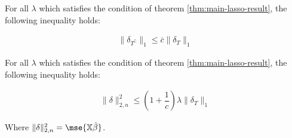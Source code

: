 \begin{claim}
\label{claim:lasso-claim-1}
For all $\lambda$ which satisfies the condition of theorem \ref{thm:main-lasso-result}, the following inequality holds:

\begin{align*}
\|\delta_{T^{\complement}}\|_1 \leq \bar{c} \|\delta_{T}\|_1
\end{align*}
\end{claim}

\begin{claim}
\label{claim:lasso-claim-2}
For all $\lambda$ which satisfies the condition of theorem \ref{thm:main-lasso-result}, the following inequality holds:

\begin{align*}
\|\delta\|_{2, n}^2 \leq \left(1 + \dfrac{1}{c}\right) \lambda \|\delta_T\|_1
\end{align*}

Where $\|\delta\|_{2, n}^2 = \mse{\Mat{X}\hat{\beta}}$.
\end{claim}